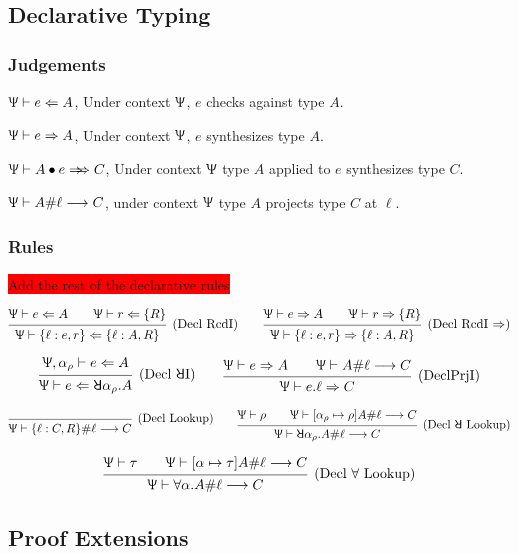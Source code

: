 \documentclass{article}
\newcommand{\todo}[1]{\colorbox{red}{#1}}
\newcommand{\declCtx}{\Uppsi}
\newcommand{\rcd}[1]{\{#1\}}
\newcommand{\rowall}{\rotatebox[origin=c]{180}{\(\mathsf{R}\)}}
\newcommand{\rowvar}{\alpha_\rho}
\newcommand{\synthesizes}{\Rightarrow \!\!\! \Rightarrow}
\newcommand{\app}{\bullet}
\newcommand{\spc}{\qquad}
\newcommand{\wf}[2]{#1 \vdash #2}
\newcommand{\declSynth}[3]{#1 \vdash #2 \Rightarrow #3}
\newcommand{\declCheck}[3]{#1 \vdash #2 \Leftarrow #3}
\newcommand{\declApSynth}[4]{#1 \vdash #2 \app #3 \synthesizes #4}
\newcommand{\declLookup}[4]{#1 \vdash #2 \# #3 \longrightarrow #4}
\newcommand{\deduct}[3][]
{
  \begin{prooftree}
    \hypo{#2}
    \infer1[\text{#1}]{#3}
  \end{prooftree}
}
\begin{document}
\subsection{Declarative Typing}

\subsubsection{Judgements}

\(\declCheck \declCtx e A\), Under context \(\declCtx\), \(e\) checks against
type \(A\).

\(\declSynth \declCtx e A\), Under context \(\declCtx\), \(e\) synthesizes type
\(A\).

\(\declApSynth \declCtx A e C\), Under context \(\declCtx\) type \(A\) applied
to \(e\) synthesizes type \(C\).

\(\declLookup \declCtx A \ell C\), under context \(\declCtx\) type \(A\)
projects type \(C\) at \(\ell\).

\subsubsection{Rules}

\todo{Add the rest of the declarative rules}

\[
  \deduct[(Decl RcdI)]
  {\declCheck \declCtx e A \spc \declCheck \declCtx r \rcd{R}}
  {\declCheck \declCtx {\rcd{\ell : e, r}} {\rcd{\ell : A, R}}}
  \spc
  \deduct[(Decl RcdI \(\Rightarrow\))]
  {\declSynth \declCtx e A \spc \declSynth \declCtx r \rcd{R}}
  {\declSynth \declCtx {\rcd{\ell : e, r}} {\rcd{\ell : A, R}}}
\]

\[
  \deduct[(Decl \(\rowall\)I)]
  {\declCheck {\declCtx, \rowvar} e A}
  {\declCheck \declCtx e {\rowall \rowvar. A}}
  \spc
  \deduct[(DeclPrjI)]
  {\declSynth \declCtx e A \spc \declLookup \declCtx A \ell C}
  {\declSynth \declCtx {e.\ell} C}
\]

\[
  \deduct[(Decl Lookup)]
  {}
  {\declLookup \declCtx {\rcd{\ell : C, R}} \ell C}
  \spc
  \deduct[(Decl \(\rowall\) Lookup)]
  {\wf \declCtx \rho \spc \declLookup \declCtx {[\rowvar \mapsto \rho]A} \ell C}
  {\declLookup \declCtx {\rowall \rowvar. A} \ell C}
\]

\[
  \deduct[(Decl \(\forall\) Lookup)]
  {\wf \declCtx \tau \spc \declLookup \declCtx {[\alpha \mapsto \tau]A} \ell C}
  {\declLookup \declCtx {\forall \alpha. A} \ell C}
\]

\subsection{Proof Extensions}
\end{document}
